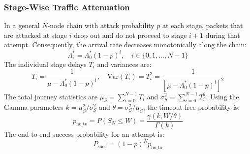 \documentclass[12pt,onecolumn]{article}
\begin{document}
\subsubsection{Stage-Wise Traffic Attenuation}
In a general $N$-node chain with attack probability $p$ at each stage, packets that are attacked at stage $i$ drop out and do not proceed to stage $i+1$ during that attempt. Consequently, the arrival rate decreases monotonically along the chain:
\begin{equation}
\Lambda_i^* = \Lambda_0^* (1 - p)^i, \quad i \in \{0, 1, \dots, N-1\}
\label{eq:tandem_attenuation}
\end{equation}
The individual stage delays $T_i$ and variances are:
\begin{equation}
T_i = \frac{1}{\mu - \Lambda_0^*(1 - p)^i}, \quad \text{Var}(T_i) = T_i^2 = \frac{1}{[\mu - \Lambda_0^*(1 - p)^i]^2}
\end{equation}
The total journey statistics are $\mu_S = \sum_{i=0}^{N-1} T_i$ and $\sigma_S^2 = \sum_{i=0}^{N-1} T_i^2$. Using the Gamma parameters $k = \mu_S^2 / \sigma_S^2$ and $\theta = \sigma_S^2 / \mu_S$, the timeout-free probability is:
\begin{equation}
p_{\text{no\_to}} = P(S_N \le W) = \frac{\gamma(k, W/\theta)}{\Gamma(k)}
\end{equation}
The end-to-end success probability for an attempt is:
\begin{equation}
P_{\text{succ}} = (1 - p)^N p_{\text{no\_to}}
\end{equation}
\end{document}
